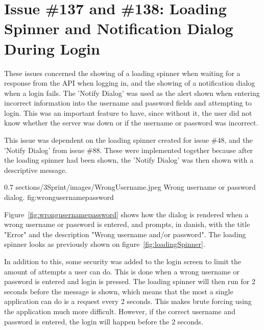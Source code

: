\section{Issue \#137 and \#138: Loading Spinner and Notification Dialog During Login}
These issues concerned the showing of a loading spinner when waiting for a response from the API when logging in, and the showing of a notification dialog when a login fails.
The 'Notify Dialog' was used as the alert shown when entering incorrect information into the username and password fields and attempting to login. This was an important feature to have, since without it, the user did not know whether the server was down or if the username or password was incorrect. 

This issue was dependent on the loading spinner created for issue \#48, and the 'Notify Dialog' from issue \#88. These were implemented together because after the loading spinner had been shown, the 'Notify Dialog' was then shown with a descriptive message.


        {0.7} %
        {sections/3Sprint/images/WrongUsername.jpeg} %
        {Wrong username or password dialog.} %
        {fig:wrongusernamepassword} %

Figure~\ref{fig:wrongusernamepassword} shows how the dialog is rendered when a wrong username or password is entered, and prompts, in danish, with the title "Error" and the description "Wrong username and/or password". The loading spinner looks as previously shown on figure~\ref{fig:loadingSpinner}.

In addition to this, some security was added to the login screen to limit the amount of attempts a user can do. This is done when a wrong username or password is entered and login is pressed. The loading spinner will then run for 2 seconds before the message is shown, which means that the most a single application can do is a request every 2 seconds. This makes brute forcing using the application much more difficult. However, if the correct username and password is entered, the login will happen before the 2 seconds. 

\iffalse
\subsubsection{Testing}
In order to test the new parts of the login screen, tests were written to press the buttons and test if logging in with wrong information showed the Dialog. This was written as integration tests, that fills a wrong username and password into the username and password text fields. When this is done the login button is pressed, and checked if a Giraf Notify Dialog is shown. 
\fi